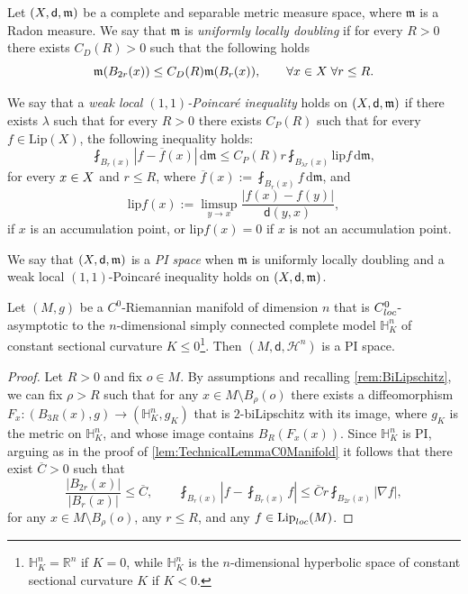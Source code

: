 \documentclass[a4paper,12pt,reqno]{amsart}
\numberwithin{equation}{section}
\theoremstyle{plain}
\theoremstyle{definition}
\theoremstyle{remark}
\newcommand{\R}{\mathbb{R}}
\newcommand{\X}{{\rm X}}
\newcommand{\haus}{\mathcal{H}}
\newcommand{\dist}{\mathsf{d}}
\newcommand{\meas}{\mathfrak{m}}
\newcommand{\de}{\ensuremath{\,\mathrm d}} %
\begin{document}
{\begin{definition}[PI space]\label{def:PI}
Let $(\X,\dist,\meas)$ be a complete and separable metric measure space, where $\meas$ is a Radon measure.
 We say that $\meas$ is {\em uniformly locally doubling} if for every $R>0$ there exists $C_D(R)>0$ such that the following holds 
 $$
 \meas(B_{2r}(x))\leq C_D(R)\meas(B_r(x)), \qquad \forall x\in\X\;\forall r\leq R.
 $$


We say that a {\em weak local $(1,1)$-Poincar\'{e} inequality} holds on $(\X,\dist,\meas)$ if there exists $\lambda$ such that for every $R>0$ there exists $C_P(R)$ such that for every $f\in \mathrm{Lip}(X)$,
the following inequality holds:
$$
\fint_{B_r(x)} |f-\overline f(x)|\de\meas \leq C_P(R)r\fint_{B_{\lambda r}(x)} \mathrm{lip}f\de\meas, 
$$
for every $x\in\X$ and $r\leq R$, where $\overline f(x):=\fint_{B_r(x)}f\de\meas$, and 
\begin{equation}\label{eqn:lip}
\mathrm{lip}f(x):=\limsup_{y\to x}\frac{|f(x)-f(y)|}{\dist(y,x)},
\end{equation}
if $x$ is an accumulation point, or $\mathrm{lip}f(x)=0$ if $x$ is not an accumulation point.


We say that $(\X,\dist,\meas)$ is a {\em PI space} when $\meas$ is uniformly locally doubling and a weak local $(1,1)$-Poincar\'{e} inequality holds on $(\X,\dist,\meas)$.
\end{definition}


\begin{corollary}\label{cor:C0locasymptoticPi}
    Let $(M,g)$ be a $C^0$-Riemannian manifold of dimension $n$ that is $C^0_{\rm loc}$-asymptotic to the $n$-dimensional simply connected complete model $\mathbb H^n_K$ of constant sectional curvature $K\le 0$\footnote{$\mathbb H^n_K=\R^n$ if $K=0$, while $\mathbb H^n_K$ is the $n$-dimensional hyperbolic space of constant sectional curvature $K$ if $K<0$.}. Then $(M, \dist, \haus^n)$ is a PI space.
\end{corollary}

\begin{proof}
    Let $R>0$ and fix $o \in M$. By assumptions and recalling \cref{rem:BiLipschitz}, we can fix $\rho>R$ such that for any $x \in M\setminus B_\rho(o)$ there exists a diffeomorphism $F_x:(B_{3R}(x), g) \to (\mathbb H^n_K, g_K)$ that is $2$-biLipschitz with its image, where $g_K$ is the metric on $\mathbb H^n_K$, {and whose image contains $B_R(F_x(x))$}. Since $\mathbb H^n_K$ is PI, arguing as in the proof of \cref{lem:TechnicalLemmaC0Manifold} it follows that there exist $\overline{C}>0$ such that
    \[
        \frac{|B_{2r}(x)|}{|B_r(x)|} \le \overline C,
        \qquad
        \fint_{B_r(x)}\left|f-\fint_{B_r(x)}f\right|\leq \overline C r\fint_{B_{2r}(x)}|\nabla f|,
    \]
    for any $x\in M \setminus B_\rho(o)$, any $r\leq R$, and any $f\in\mathrm{Lip}_{\rm loc}(M)$.
    

\end{proof}}
\end{document}
